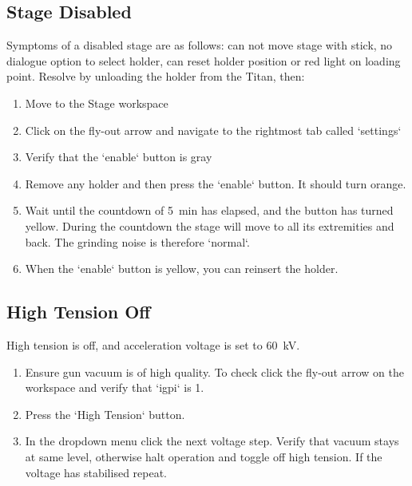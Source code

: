 \documentclass[a4paper]{scrartcl}
\begin{document}
\subsection*{Stage Disabled}
Symptoms of a disabled stage are as follows: can not move stage with stick, no dialogue option to select holder, can reset holder position or red light on loading point.
Resolve by unloading the holder from the Titan, then:
\begin{enumerate}
	\item Move to the Stage workspace
	\item Click on the fly-out arrow and navigate to the rightmost tab called `settings`
	\item Verify that the `enable` button is gray
	\item Remove any holder and then press the `enable` button. It should turn orange.
	\item Wait until the countdown of \SI{5}{\minute} has elapsed, and the button has turned yellow. During the countdown the stage will move to all its extremities and back. The grinding noise is therefore `normal`.
	\item When the `enable` button is yellow, you can reinsert the holder.
\end{enumerate}

\subsection*{High Tension Off}
High tension is off, and acceleration voltage is set to \SI{60}{\kilo \volt}.
\begin{enumerate}
	\item Ensure gun vacuum is of high quality. To check click the fly-out arrow on the workspace and verify that `igpi` is \SI{1}{\log}.
	\item Press the `High Tension` button.
	\item In the dropdown menu click the next voltage step. Verify that vacuum stays at same level, otherwise halt operation and toggle off high tension. If the voltage has stabilised repeat.
\end{enumerate}
\end{document}
